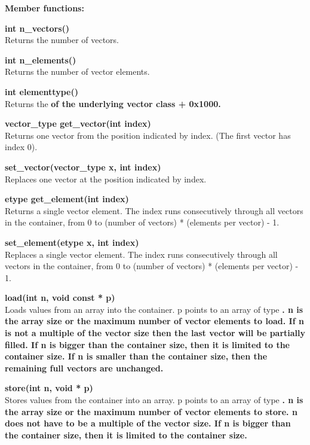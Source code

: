 \documentclass[11pt,a4paper,oneside,openright]{report}
\newcommand{\vspacebig}{\vspace{6mm}}
\newcommand{\codei}[1]{\bfseries \ttfamily{#1}\normalfont}
\begin{document}
{\bfseries Member functions:}\\
\vspacebig

{\bfseries int n\_vectors()}\\
Returns the number of vectors.
\vspacebig

{\bfseries int n\_elements()}\\
Returns the number of vector elements.
\vspacebig

{\bfseries int elementtype()}\\
Returns the \codei{elementtype()} of the underlying vector class + 0x1000.
\vspacebig

{\bfseries vector\_type get\_vector(int index)}\\
Returns one vector from the position indicated by index. (The first vector has index 0).
\vspacebig

{\bfseries set\_vector(vector\_type x, int index)}\\
Replaces one vector at the position indicated by index.
\vspacebig

{\bfseries etype get\_element(int index)}\\
Returns a single vector element. The index runs consecutively through all vectors in the container, from 0 to (number of vectors) * (elements per vector) - 1.
\vspacebig

{\bfseries set\_element(etype x, int index)}\\
Replaces a single vector element. The index runs consecutively through all vectors in the container, from 0 to (number of vectors) * (elements per vector) - 1.
\vspacebig

{\bfseries load(int n, void const {*} p)}\\
Loads values from an array into the container. p points to an array of type 
\codei{etype}. n is the array size or the maximum number of vector elements to load. If n is not a multiple of the vector size then the last vector will be partially filled. If n is bigger than the container size, then it is limited to the container size. If n is smaller than the container size, then the remaining full vectors are unchanged.
\vspacebig

{\bfseries store(int n, void * p)}\\
Stores values from the container into an array. p points to an array of type 
\codei{etype}.
n is the array size or the maximum number of vector elements to store. n does not have to be a multiple of the vector size. If n is bigger than the container size, then it is limited to the container size.
\vspacebig
\end{document}
